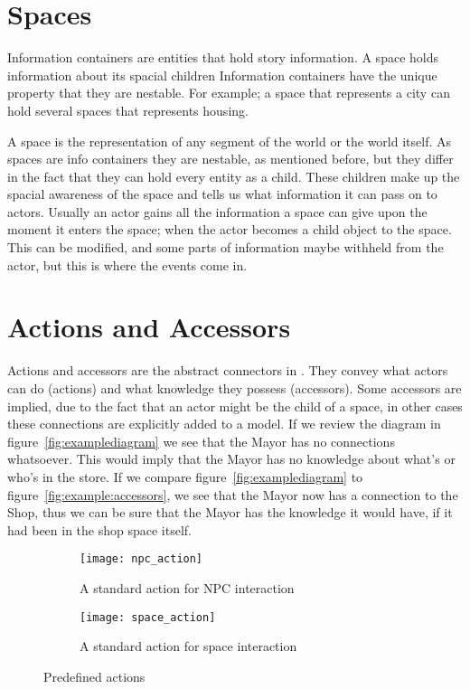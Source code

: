 \section{Spaces}
\label{sec:informationcontainers}
Information containers are entities that hold story information.
A space holds information about its spacial children Information containers have the unique property that they are nestable.
For example; a space that represents a city can hold several spaces that represents housing.


A space is the representation of any segment of the world or the world itself.
As spaces are info containers they are nestable, as mentioned before, but they differ in the fact that they can hold every entity as a child.
These children make up the spacial awareness of the space and tells us what information it can pass on to actors.
Usually an actor gains all the information a space can give upon the moment it enters the space; when the actor becomes a child object to the space.
This can be modified, and some parts of information maybe withheld from the actor, but this is where the events come in.

\section{Actions and Accessors}
\label{sec:actions_and_accessors}
Actions and accessors are the abstract connectors in \diage.
They convey what actors can do (actions) and what knowledge they possess (accessors).
Some accessors are implied, due to the fact that an actor might be the child of a space, in other cases these connections are explicitly added to a \diage model.
If we review the diagram in figure~\ref{fig:examplediagram} we see that the Mayor has no connections whatsoever.
This would imply that the Mayor has no knowledge about what's or who's in the store.
If we compare figure~\ref{fig:examplediagram} to figure~\ref{fig:example:accessors}, we see that the Mayor now has a connection to the Shop, thus we can be sure that the Mayor has the knowledge it would have, if it had been in the shop space itself.

\begin{figure}[ht]
	\centering
	\begin{subfigure}[b]{0.3\textwidth}
		\texttt{[image: npc\_action]}
		\caption{A standard action for NPC interaction}\label{fig:actions:npc}
	\end{subfigure}
	\begin{subfigure}[b]{0.3\textwidth}
		\texttt{[image: space\_action]}
		\caption{A standard action for space interaction}\label{fig:actions:space}
	\end{subfigure}
	\caption{Predefined actions}\label{fig:actions}
\end{figure}

